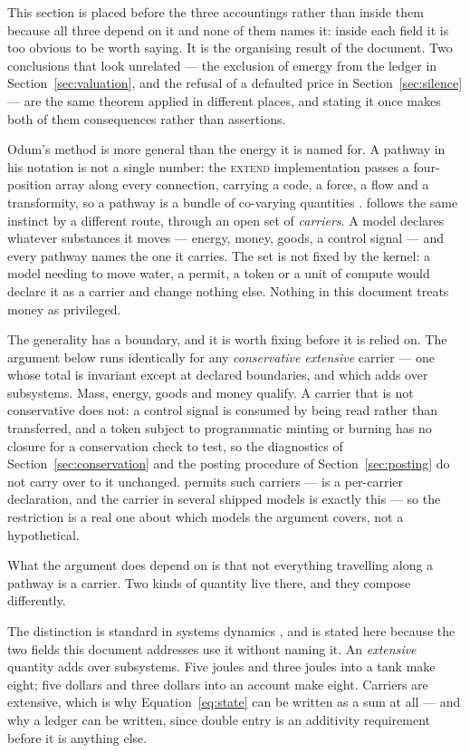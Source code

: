 \documentclass[11pt,a4paper]{article}
\begin{document}
This section is placed before the three accountings rather than inside them because all three depend on it and none of them names it: inside each field it is too obvious to be worth saying. It is the organising result of the document. Two conclusions that look unrelated --- the exclusion of emergy from the ledger in Section~\ref{sec:valuation}, and the refusal of a defaulted price in Section~\ref{sec:silence} --- are the same theorem applied in different places, and stating it once makes both of them consequences rather than assertions.

Odum's method is more general than the energy it is named for. A pathway in his notation is not a single number: the \textsc{extend} implementation passes a four-position array along every connection, carrying a code, a force, a flow and a transformity, so a pathway is a bundle of co-varying quantities \citep{odum2000}. \gssk{} follows the same instinct by a different route, through an open set of \emph{carriers}. A model declares whatever substances it moves --- energy, money, goods, a control signal --- and every pathway names the one it carries. The set is not fixed by the kernel: a model needing to move water, a permit, a token or a unit of compute would declare it as a carrier and change nothing else. Nothing in this document treats money as privileged.

The generality has a boundary, and it is worth fixing before it is relied on. The argument below runs identically for any \emph{conservative extensive} carrier --- one whose total is invariant except at declared boundaries, and which adds over subsystems. Mass, energy, goods and money qualify. A carrier that is not conservative does not: a control signal is consumed by being read rather than transferred, and a token subject to programmatic minting or burning has no closure for a conservation check to test, so the diagnostics of Section~\ref{sec:conservation} and the posting procedure of Section~\ref{sec:posting} do not carry over to it unchanged. \gssk{} permits such carriers ---  is a per-carrier declaration, and the  carrier in several shipped models is exactly this --- so the restriction is a real one about which models the argument covers, not a hypothetical.

What the argument does depend on is that not everything travelling along a pathway is a carrier. Two kinds of quantity live there, and they compose differently.

The distinction is standard in systems dynamics \citep{sterman2000}, and is stated here because the two fields this document addresses use it without naming it. An \emph{extensive} quantity adds over subsystems. Five joules and three joules into a tank make eight; five dollars and three dollars into an account make eight. Carriers are extensive, which is why Equation~\eqref{eq:state} can be written as a sum at all --- and why a ledger can be written, since double entry is an additivity requirement before it is anything else.
\end{document}
